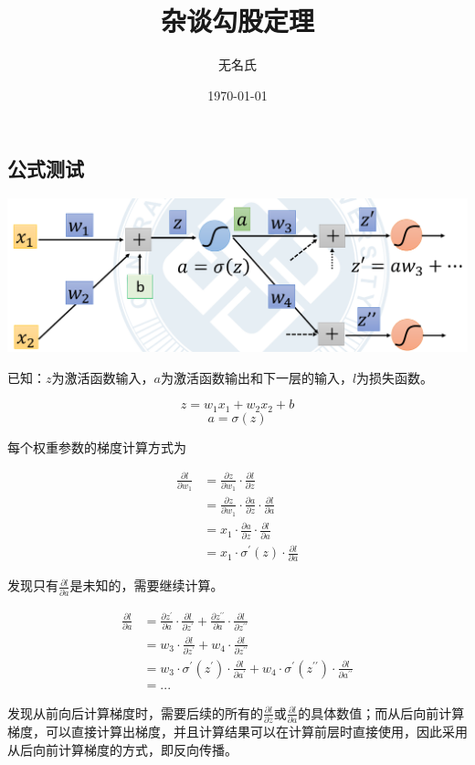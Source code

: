 \documentclass[12pt]{ctexart}
\title{杂谈勾股定理}
\author{无名氏}
\date{\today}
\begin{document}
\maketitle
\section{公式测试}

\newpage
\centering  
\includegraphics[width=\textwidth]{1.png} 
\label{fig:my_label}

已知：$z$为激活函数输入，$a$为激活函数输出和下一层的输入，$l$为损失函数。

$$z=w_1x_1+w_2x_2+b$$
$$a=\sigma (z)$$

每个权重参数的梯度计算方式为

\begin{equation}
    \begin{aligned}
        \frac{\partial l}{\partial w_1} &= \frac{\partial z}{\partial w_1} \cdot \frac{\partial l}{\partial z}\\
        &=\frac{\partial z}{\partial w_1} \cdot \frac{\partial a}{\partial z} \cdot \frac{\partial l}{\partial a}\\
        &=x_1 \cdot \frac{\partial a}{\partial z} \cdot \frac{\partial l}{\partial a}\\
        &=x_1 \cdot \sigma^\prime (z) \cdot \frac{\partial l}{\partial a}
    \end{aligned}
\end{equation}

发现只有$\frac{\partial l}{\partial a}$是未知的，需要继续计算。

\begin{equation}
    \begin{aligned}
        \frac{\partial l}{\partial a} &= \frac{\partial z^\prime}{\partial a} \cdot \frac{\partial l}{\partial z^\prime} 
        + \frac{\partial z^{\prime\prime}}{\partial a} \cdot \frac{\partial l}{\partial z^{\prime\prime}} 
        \\
        &= w_3 \cdot \frac{\partial l}{\partial z^\prime} + w_4 \cdot \frac{\partial l}{\partial z^{\prime\prime}}\\
        &= w_3 \cdot \sigma^\prime (z^\prime) \cdot \frac{\partial l}{\partial a^\prime} + w_4 \cdot \sigma^\prime (z^{\prime\prime}) \cdot  \frac{\partial l}{\partial a^{\prime\prime}}\\
        &= ...
    \end{aligned}
\end{equation}

\flushleft
发现从前向后计算梯度时，需要后续的所有的$\frac{\partial l}{\partial z}$或$\frac{\partial l}{\partial a}$的具体数值；而从后向前计算梯度，可以直接计算出梯度，并且计算结果可以在计算前层时直接使用，因此采用从后向前计算梯度的方式，即反向传播。

\chapter{}
\end{document}
